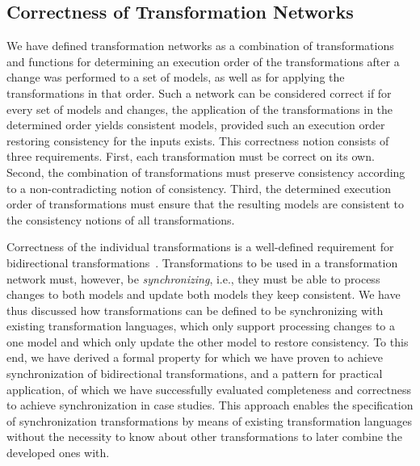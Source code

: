 \subsection{Correctness of Transformation Networks}

We have defined transformation networks as a combination of transformations and functions for determining an execution order of the transformations after a change was performed to a set of models, as well as for applying the transformations in that order.
Such a network can be considered correct if for every set of models and changes, the application of the transformations in the determined order yields consistent models, provided such an execution order restoring consistency for the inputs exists.
This correctness notion consists of three requirements.
First, each transformation must be correct on its own. Second, the combination of transformations must preserve consistency according to a non-contradicting notion of consistency. Third, the determined execution order of transformations must ensure that the resulting models are consistent to the consistency notions of all transformations.

Correctness of the individual transformations is a well-defined requirement for bidirectional transformations~\cite{stevens2010sosym}.
Transformations to be used in a transformation network must, however, be \emph{synchronizing}, i.e., they must be able to process changes to both models and update both models they keep consistent.
We have thus discussed how transformations can be defined to be synchronizing with existing transformation languages, which only support processing changes to a one model and which only update the other model to restore consistency.
To this end, we have derived a formal property for which we have proven to achieve synchronization of bidirectional transformations, and a pattern for practical application, of which we have successfully evaluated completeness and correctness to achieve synchronization in case studies.
This approach enables the specification of synchronization transformations by means of existing transformation languages without the necessity to know about other transformations to later combine the developed ones with.

